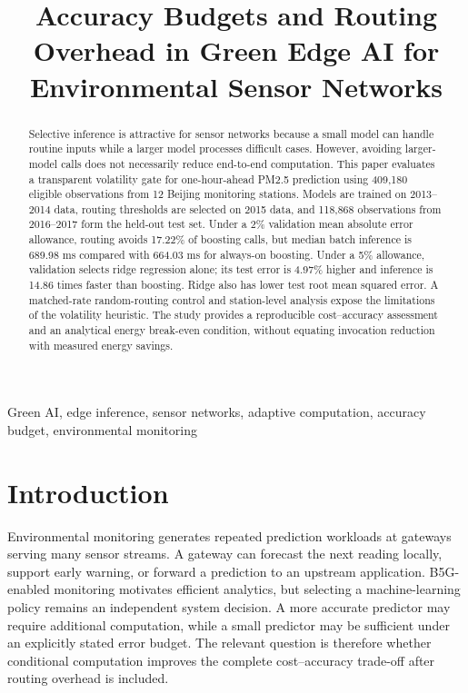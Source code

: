 \documentclass[conference,a4paper]{IEEEtran}
\begin{document}
\title{Accuracy Budgets and Routing Overhead in Green Edge AI for Environmental Sensor Networks}
\author{}
\maketitle
\begin{abstract}Selective inference is attractive for sensor networks because a small model can handle routine inputs while a larger model processes difficult cases. However, avoiding larger-model calls does not necessarily reduce end-to-end computation. This paper evaluates a transparent volatility gate for one-hour-ahead PM2.5 prediction using 409,180 eligible observations from 12 Beijing monitoring stations. Models are trained on 2013--2014 data, routing thresholds are selected on 2015 data, and 118,868 observations from 2016--2017 form the held-out test set. Under a 2\% validation mean absolute error allowance, routing avoids 17.22\% of boosting calls, but median batch inference is 689.98 ms compared with 664.03 ms for always-on boosting. Under a 5\% allowance, validation selects ridge regression alone; its test error is 4.97\% higher and inference is 14.86 times faster than boosting. Ridge also has lower test root mean squared error. A matched-rate random-routing control and station-level analysis expose the limitations of the volatility heuristic. The study provides a reproducible cost--accuracy assessment and an analytical energy break-even condition, without equating invocation reduction with measured energy savings.\end{abstract}
\begin{IEEEkeywords}Green AI, edge inference, sensor networks, adaptive computation, accuracy budget, environmental monitoring\end{IEEEkeywords}
\section{Introduction}
Environmental monitoring generates repeated prediction workloads at gateways serving many sensor streams. A gateway can forecast the next reading locally, support early warning, or forward a prediction to an upstream application. B5G-enabled monitoring motivates efficient analytics, but selecting a machine-learning policy remains an independent system decision. A more accurate predictor may require additional computation, while a small predictor may be sufficient under an explicitly stated error budget. The relevant question is therefore whether conditional computation improves the complete cost--accuracy trade-off after routing overhead is included.
\end{document}
